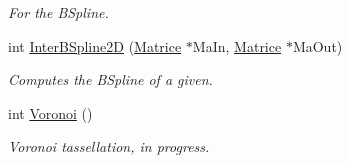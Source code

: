 \begin{DoxyCompactItemize}
\begin{DoxyCompactList}\small\item\em For the B\+Spline. \end{DoxyCompactList}\item 
int \hyperlink{classMatematica_a9566503fbc9720a56e0439302fcc10ce}{Inter\+B\+Spline2D} (\hyperlink{classMatrice}{Matrice} $\ast$Ma\+In, \hyperlink{classMatrice}{Matrice} $\ast$Ma\+Out)
\begin{DoxyCompactList}\small\item\em Computes the B\+Spline of a given. \end{DoxyCompactList}\item 
int \hyperlink{classMatematica_a74028c96f1da61fd4bb0b0df6c720bc0}{Voronoi} ()\hypertarget{classMatematica_a74028c96f1da61fd4bb0b0df6c720bc0}{}\label{classMatematica_a74028c96f1da61fd4bb0b0df6c720bc0}

\begin{DoxyCompactList}\small\item\em Voronoi tassellation, in progress. \end{DoxyCompactList}\end{DoxyCompactItemize}
